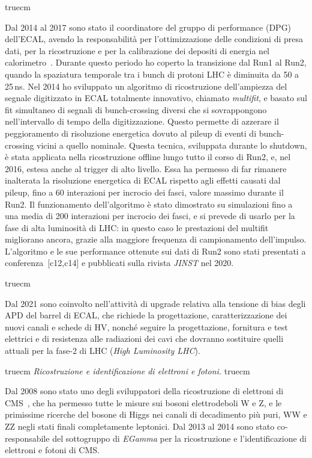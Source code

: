 \documentclass[11pt,twoside,a4paper]{article}
\begin{document}
 truecm

Dal 2014 al 2017 sono stato il coordinatore del gruppo di performance
(DPG) dell'ECAL, avendo la responsabilit\`a per l'ottimizzazione delle
condizioni di presa dati, per la ricostruzione e per la calibrazione
dei depositi di energia nel
calorimetro~\cite{Khachatryan:2015iwa}. Durante questo periodo ho
coperto la transizione dal Run1 al Run2, quando la spaziatura
temporale tra i bunch di protoni LHC \`e diminuita da 50 a 25\,ns. Nel
2014 ho sviluppato un algoritmo di ricostruzione dell'ampiezza del
segnale digitizzato in ECAL totalmente innovativo, chiamato
\textit{multifit}, e basato sul fit simultaneo di segnali di
bunch-crossing diversi che si sovrappongono nell'intervallo di tempo
della digitizzazione.  Questo permette di azzerare il peggioramento di
risoluzione energetica dovuto al pileup di eventi di bunch-crossing
vicini a quello nominale.  Questa tecnica, sviluppata durante lo
shutdown, \`e stata applicata nella ricostruzione offline lungo tutto
il corso di Run2, e, nel 2016, estesa anche al trigger di alto
livello.  Essa ha permesso di far rimanere inalterata la risoluzione
energetica di ECAL rispetto agli effetti causati dal pileup, fino a 60
interazioni per incrocio dei fasci, valore massimo durante il Run2.
Il funzionamento dell'algoritmo \`e stato dimostrato su simulazioni
fino a una media di 200 interazioni per incrocio dei fasci, e si
prevede di usarlo per la fase di alta luminosit\`a di LHC: in questo
caso le prestazioni del multifit migliorano ancora, grazie alla
maggiore frequenza di campionamento dell'impulso. L'algoritmo e le sue
performance ottenute sui dati di Run2 sono stati presentati a
conferenza~[c12,c14] e pubblicati sulla rivista \textit{JINST} nel
2020.

 truecm

Dal 2021 sono coinvolto nell'attivit\`a di upgrade relativa alla
tensione di bias degli APD del barrel di ECAL, che richiede la
progettazione, caratterizzazione dei nuovi canali e schede di HV,
nonch\'e seguire la progettazione, fornitura e test elettrici e di
resistenza alle radiazioni dei cavi che dovranno sostituire quelli
attuali per la fase-2 di LHC (\textit{High Luminosity LHC}).


 truecm
\textit{Ricostruzione e identificazione di elettroni e fotoni.}
 truecm

Dal 2008 sono stato uno degli sviluppatori della ricostruzione di
elettroni di CMS~\cite{Khachatryan:2015hwa}, che ha permesso tutte le
misure sui bosoni elettrodeboli W e Z, e le primissime ricerche del
bosone di Higgs nei canali di decadimento pi\`u puri, WW e ZZ negli
stati finali completamente leptonici. Dal 2013 al 2014 sono stato
co-responsabile del sottogruppo di \textit{EGamma} per la
ricostruzione e l'identificazione di elettroni e fotoni di CMS.
\end{document}
